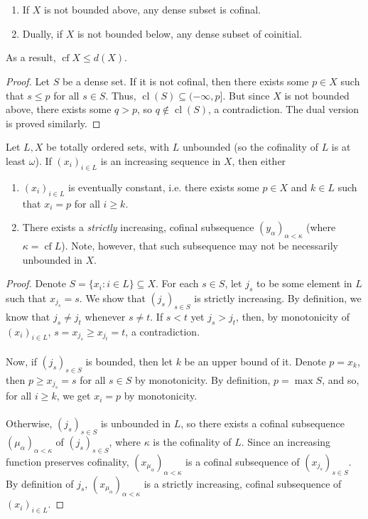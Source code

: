 \documentclass{treatise}
\begin{document}
\ \\
\begin{proposition} \ 
\begin{enumerate}
    \item If $X$ is not bounded above, any dense subset is cofinal.
    \item Dually, if $X$ is not bounded below, any dense subset of coinitial.
\end{enumerate}
 As a result, $\operatorname{cf} X \leq d(X)$.
\end{proposition}
\begin{proof}
Let $S$ be a dense set. If it is not cofinal, then there exists some $p \in X$ such that $s \leq p$ for all $s \in S$. Thus, $\operatorname{cl}(S) \subseteq (-\infty, p]$. But since $X$ is not bounded above, there exists some $q > p$, so $q \notin \operatorname{cl}(S)$, a contradiction. The dual version is proved similarly.
\end{proof}
\begin{theorem}
Let $L, X$ be totally ordered sets, with $L$ unbounded (so the cofinality of $L$ is at least $\omega$). If $(x_i)_{i \in L}$ is an increasing sequence in $X$, then either
\begin{enumerate}
    \item $(x_i)_{i \in L}$ is eventually constant, i.e. there exists some $p \in X$ and $k \in L$ such that $x_i = p$ for all $i \geq k$.
    \item There exists a \textit{strictly} increasing, cofinal subsequence $(y_\alpha)_{\alpha < \kappa}$ (where $\kappa = \operatorname{cf} L$). Note, however, that such subsequence may not be necessarily unbounded in $X$.
\end{enumerate}
\end{theorem}
\begin{proof}
Denote $S = \{ x_i : i \in L \} \subseteq X$. For each $s \in S$, let $j_s$ to be some element in $L$ such that $x_{j_s} = s$. We show that $(j_s)_{s \in S}$ is strictly increasing. By definition, we know that $j_s \neq j_t$ whenever $s \neq t$. If $s < t$ yet $j_s > j_t$, then, by monotonicity of $(x_i)_{i \in L}$, $s = x_{j_s} \geq x_{j_t} = t$, a contradiction.
\\
\\
Now, if $(j_s)_{s \in S}$ is bounded, then let $k$ be an upper bound of it. Denote $p = x_k$, then $p \geq x_{j_s} = s$ for all $s \in S$ by monotonicity. By definition, $p = \max S$, and so, for all $i \geq k$, we get $x_i = p$ by monotonicity.
\\
\\
Otherwise, $(j_s)_{s \in S}$ is unbounded in $L$, so there exists a cofinal subsequence $(\mu_\alpha)_{\alpha < \kappa}$ of $(j_s)_{s \in S}$, where $\kappa$ is the cofinality of $L$. Since an increasing function preserves cofinality, $(x_{\mu_\alpha})_{\alpha < \kappa}$ is a cofinal subsequence of $(x_{j_s})_{s \in S}$. By definition of $j_s$, $(x_{\mu_\alpha})_{\alpha < \kappa}$ is a strictly increasing, cofinal subsequence of $(x_i)_{i \in L}$.
\end{proof}
\end{document}
